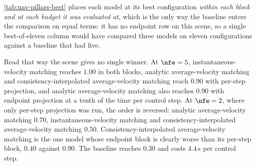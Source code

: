 \autoref{tab:uav-pillars-best} places each model at its best configuration \emph{within each block and at
each budget it was evaluated at}, which is the only way the baseline enters the comparison on equal terms:
it has no endpoint row on this scene, so a single best-of-eleven column would have compared three models
on eleven configurations against a baseline that had five.

Read that way the scene gives no single winner. At $\nfe=5$, instantaneous-velocity matching reaches
$1.00$ in both blocks, analytic average-velocity matching and consistency-interpolated average-velocity
matching reach $0.90$ with per-step projection, and analytic average-velocity matching also reaches $0.90$
with endpoint projection at a tenth of the time per control step. At $\nfe=2$, where only per-step
projection was run, the order is reversed: analytic average-velocity matching $0.70$, instantaneous-velocity
matching and consistency-interpolated average-velocity matching $0.50$. Consistency-interpolated
average-velocity matching is the one model whose endpoint block is clearly worse than its per-step block,
$0.40$ against $0.90$. The baseline reaches $0.30$ and costs $4.4$\,s per control step.

